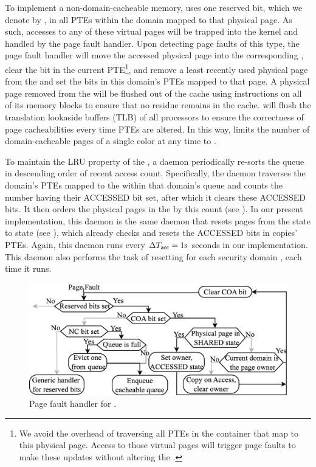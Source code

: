 To implement a non-domain-cacheable memory, \cachebar uses one
reserved bit, which we denote by \LRU, in all \gls{PTE}s within the domain
mapped to that physical page.  As such, accesses to any of these
virtual pages will be trapped into the kernel and handled by the page
fault handler. Upon detecting page faults of this type, the page fault
handler will move the accessed physical page into the corresponding
\lru, clear the \LRU bit in the current \gls{PTE}\footnote{We avoid the
overhead of traversing all \gls{PTE}s in the container that map to this
physical page. Access to those virtual pages will trigger page faults
to make these updates without altering the \lru.}, and remove a least
recently used physical page from the \lru and set the \LRU bits in
this domain's \gls{PTE}s mapped to that page.  A physical page removed from
the \lru will be flushed out of the cache using \clflush instructions
on all of its memory blocks to ensure that no residue remains in the
cache. \cachebar will flush the translation lookaside buffers (TLB) of
all processors to ensure the correctness of page cacheabilities every
time \gls{PTE}s are altered. In this way, \cachebar limits the number of
domain-cacheable pages of a single color at any time to
\linesPerContainer{\containerIdx}.

To maintain the LRU property of the \lru, a daemon periodically
re-sorts the queue in descending order of recent access count.
Specifically, the daemon traverses the domain's
\glspl{PTE} mapped to the \ppage within that domain's queue and counts the number having their ACCESSED bit set, after which
it clears these ACCESSED bits.  It then orders the physical pages in
the \lru by this count (see ).  In our present
implementation, this daemon is the same daemon that resets pages from
the \accessed state to \shared state (see ), which
already checks and resets the ACCESSED bits in copies' \gls{PTE}s.  Again, this
daemon runs every $\Delta{T}_{\mathsf{acc}} = 1\mathrm{s}$ seconds in our
implementation.  This daemon also performs the task of resetting
\linesPerContainer{\containerIdx} for each security domain
\containerIdx, each time it runs.

\begin{figure}[bt]
	\centering
\includegraphics[width=0.9\linewidth]{fig/cachebar/page_fault.eps}
\caption{Page fault handler for \cachebar.\label{fig:fault}}
 \vspace{-0.1in}
\end{figure}

